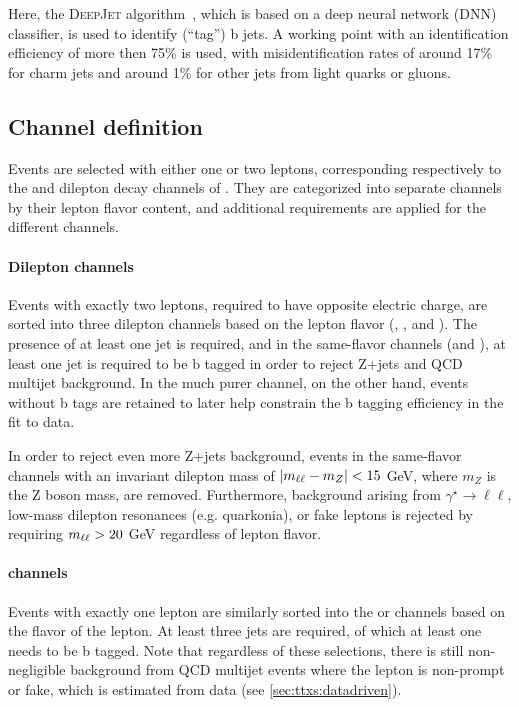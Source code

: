 Here, the \textsc{DeepJet} algorithm~\cite{DeepJet:2020,CMS:BTV-16-002}, which is based on a deep neural network (DNN) classifier, is used to identify (``tag'') b jets. A working point with an identification efficiency of more then 75\% is used, with misidentification rates of around 17\% for charm jets and around 1\% for other jets from light quarks or gluons.

\subsection{Channel definition}
\label{sec:ttxs:channels}

Events are selected with either one or two leptons, corresponding respectively to the \ljets and dilepton decay channels of \ttbar. They are categorized into separate channels by their lepton flavor content, and additional requirements are applied for the different channels. 

\paragraph{Dilepton channels}

Events with exactly two leptons, required to have opposite electric charge, are sorted into three dilepton channels based on the lepton flavor (\emu, \ee, and \mumu). The presence of at least one jet is required, and in the same-flavor channels (\ee and \mumu), at least one jet is required to be b tagged in order to reject Z+jets and QCD multijet background. In the much purer \emu channel, on the other hand, events without b tags are retained to later help constrain the b tagging efficiency in the fit to data.

In order to reject even more Z+jets background, events in the same-flavor channels with an invariant dilepton mass of $| m_{\ell\ell} - m_Z | < 15$ GeV, where $m_Z$ is the Z boson mass, are removed. Furthermore, background arising from $\gamma^\star \rightarrow \ell\ell$, low-mass dilepton resonances (e.g. quarkonia), or fake leptons is rejected by requiring $m_{\ell\ell} > 20$ GeV regardless of lepton flavor.

\paragraph{\ljets channels}

Events with exactly one lepton are similarly sorted into the \ejets or \mujets channels based on the flavor of the lepton. At least three jets are required, of which at least one needs to be b tagged. Note that regardless of these selections, there is still non-negligible background from QCD multijet events where the lepton is non-prompt or fake, which is estimated from data (see \cref{sec:ttxs:datadriven}).

